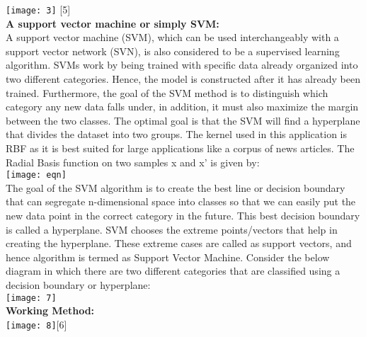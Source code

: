 \documentclass[12pt]{article}
\begin{document}
\texttt{[image: 3]}
[5]\\
\textbf{A support vector machine or simply SVM:}\\
A support vector machine (SVM), which can be used interchangeably with a support vector network (SVN), is also considered to be a supervised learning algorithm. SVMs work by being trained with specific data already organized into two different categories. Hence, the model is constructed after it has already been trained. Furthermore, the goal of the SVM method is to distinguish which category any new data falls under, in addition, it must also maximize the margin between the two classes. The optimal goal is that the SVM will find a hyperplane that divides the dataset into two groups. The kernel used in this application is RBF as it is best suited for large applications like a corpus of news articles. The Radial Basis function on two samples x and x’ is given by: \\
\texttt{[image: eqn]}\\
The goal of the SVM algorithm is to create the best line or decision boundary that can segregate n-dimensional space into classes so that we can easily put the new data point in the correct category in the future. This best decision boundary is called a hyperplane.
SVM chooses the extreme points/vectors that help in creating the hyperplane. These extreme cases are called as support vectors, and hence algorithm is termed as Support Vector Machine. 
Consider the below diagram in which there are two different categories that are classified using a decision boundary or hyperplane:\\
\texttt{[image: 7]}\\
\newpage
\textbf{Working Method:}\\
\texttt{[image: 8]}[6]\\
\end{document}
